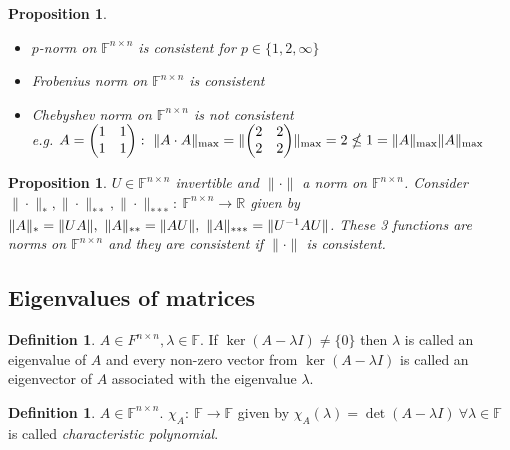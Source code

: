 \documentclass[12pt]{article}
\newtheorem{proposition}[theorem]{Proposition}
\theoremstyle{definition}
\newtheorem{definition}[theorem]{Definition}
\theoremstyle{remark}
\numberwithin{equation}{section}
\newcommand{\F}{\mathbb{F}}
\newcommand{\R}{\mathbb{R}}
\newcommand{\normempty}{\|\cdot\|}
\DeclarePairedDelimiter{\norm}{\lVert}{\rVert}
\begin{document}
\begin{proposition}~\\
  \begin{itemize}
    \item $p$-norm on $\F^{n \times n}$ is consistent for $p \in \{1, 2, \infty\}$
    \item Frobenius norm on $\F^{n \times n}$ is consistent
    \item Chebyshev norm on $\F^{n \times n}$ is \emph{not} consistent \\[0.5\baselineskip]
      e.g. $A =
      \begin{pmatrix} 1 & 1 \\ 1 & 1
      \end{pmatrix}:\ \norm{A\cdot A}_{\max} = \norm{
        \begin{pmatrix} 2 & 2 \\ 2 & 2
      \end{pmatrix}}_{\max} = 2 \nleq 1 = \norm{A}_{\max} \norm{A}_{\max}$
  \end{itemize}
\end{proposition}
\begin{proposition}
  \label{prop:consistent-norms}
  $U\in \F^{n \times n}$ invertible and $\normempty$ a norm on $\F^{n \times n}$. Consider $\normempty_*, \normempty_{**}, \normempty_{***}:\ \F^{n \times n} \rightarrow \R$ given by $\norm{A}_* = \norm{UA},\ \norm{A}_{**} = \norm{AU},\ \norm{A}_{***} = \norm{U^{-1}AU}$. These 3 functions are norms on $\F^{n \times n}$ and they are consistent if $\normempty$ is consistent.
\end{proposition}

\subsection*{Eigenvalues of matrices}
\begin{definition}
  $A \in F^{n \times n}, \lambda \in \F$. If $\ker(A - \lambda I) \neq \{0\}$ then $\lambda$ is called an eigenvalue of $A$ and every non-zero vector from $\ker(A - \lambda I)$ is called an eigenvector of $A$ associated with the eigenvalue $\lambda$.
\end{definition}

\begin{definition}
  $A \in \F^{n \times n}$. $\chi_A:\ \F \rightarrow \F$ given by $\chi_A(\lambda) = \det(A - \lambda I)\ \forall \lambda \in \F $ is called \emph{characteristic polynomial}.
\end{definition}
\end{document}
